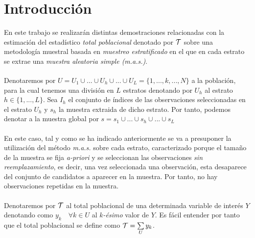 \documentclass{article}
\begin{document}
  \maketitle



  \section{Introducción}

    \paragraph{}
    En este trabajo se realizarán distintas demostraciones relacionadas con la estimación del estadístico \emph{total poblacional} denotado por $\mathcal{T}$ sobre una metodología muestral basada en \emph{muestreo estratificado} en el que en cada estrato se extrae una \emph{muestra aleatoria simple (m.a.s.)}.

    \paragraph{}
    Denotaremos por $U = U_1 \cup ... \cup U_h \cup... \cup U_L = \{1, ...,k,...,N\} $ a la población, para la cual tenemos una división en $L$ estratos denotando por $U_h$ al estrato $h \in \{1,..., L\}$. Sea $I_h$ el conjunto de índices de las observaciones seleccionadas en el estrato $U_h$ y $s_h$ la muestra extraida de dicho estrato. Por tanto, podemos denotar a la muestra global por $s = s_1 \cup ... \cup s_h \cup ... \cup s_L$

    \paragraph{}
    En este caso, tal y como se ha indicado anteriormente se va a presuponer la utilización del método \emph{m.a.s.} sobre cada estrato, caracterizado porque el tamaño de la muestra se fija \emph{a-priori} y se seleccionan las observaciones \emph{sin reemplazamiento}, es decir, una vez seleccionada una observación, esta desaparece del conjunto de candidatos a aparecer en la muestra. Por tanto, no hay observaciones repetidas en la muestra.

    \paragraph{}
    Denotaremos por $\mathcal{T}$ al total poblacional de una determinada variable de interés $Y$ denotando como $y_k \quad \forall k \in U$ al \emph{$k$-ésimo} valor de $Y$. Es fácil entender por tanto que el total poblacional se define como $\mathcal{T} = \sum\limits_U y_k$.
\end{document}
